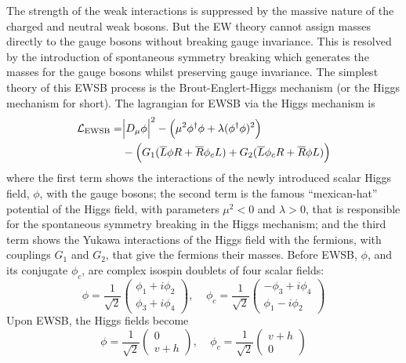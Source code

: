 The strength of the weak interactions is suppressed by the massive
nature of the charged and neutral weak bosons. But the EW theory 
cannot assign masses directly to the gauge bosons without breaking 
gauge invariance. This is resolved by the introduction of 
spontaneous symmetry breaking which generates the masses for the 
gauge bosons whilst preserving gauge invariance. 
The simplest theory of this EWSB process 
is the Brout-Englert-Higgs 
mechanism  \cite{PhysRevLett.13.321,PhysRevLett.13.508}
(or the Higgs mechanism for short).
The lagrangian for EWSB via the Higgs mechanism is 
\begin{equation}
\begin{aligned}
\mathcal{L}_{\textrm{EWSB}} =& \Big|
			D_{\mu}\phi\Big|^2 
			- \Big(\mu^2 \phi^{\dagger} \phi + \lambda (\phi^{\dagger}\phi)^2 \Big) \\
			&- \Big(G_1 (\overline{L}\phi R  + \overline{R}\phi_c L)
			      + G_2 (\overline{L}\phi_c R + \overline{R}\phi L) \Big)
\end{aligned}
\label{eq:lagrangian_ewsb}
\end{equation}
where the first term shows the interactions of the newly 
introduced scalar Higgs field, $\phi$, with the gauge bosons; 
the second term is the famous ``mexican-hat'' potential 
of the Higgs field, with parameters $\mu^2 < 0$ and $\lambda>0$, 
that is responsible for the spontaneous symmetry 
breaking in the Higgs mechanism;
and the third term shows the Yukawa interactions 
of the Higgs field with the fermions, with couplings $G_1$ and $G_2$,
that give the fermions their masses.
Before EWSB, $\phi$, and its conjugate $\phi_c$, 
are complex isospin doublets of four scalar fields:
\begin{equation}
\phi = \frac{1}{\sqrt{2}}
\begin{pmatrix} 
\phi_1 + i \phi_2 \\
\phi_3 + i \phi_4
\end{pmatrix}
,~~~~~
\phi_c = \frac{1}{\sqrt{2}}
\begin{pmatrix} 
-\phi_3 + i \phi_4 \\
\phi_1 - i \phi_2
\end{pmatrix}
\end{equation}
Upon EWSB, the Higgs fields become
\begin{equation}
\phi = \frac{1}{\sqrt{2}}
\begin{pmatrix} 
0\\
v+h
\end{pmatrix}
,~~~~~
\phi_c = \frac{1}{\sqrt{2}}
\begin{pmatrix} 
v + h\\
0
\end{pmatrix}
\end{equation}

